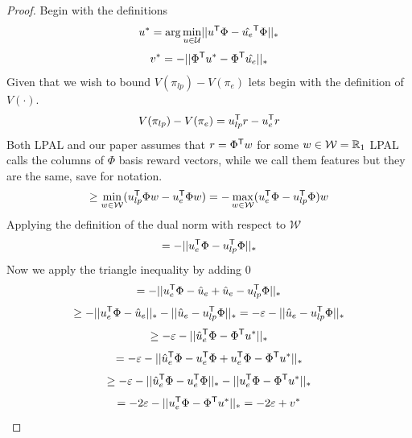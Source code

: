 \documentclass[11pt]{uai2023}
\begin{document}
\begin{proof}
	Begin with the definitions
	\[
		u^* = \arg\min_{u \in \mathcal{U}} \lvert\lvert u^{\mathsf{T}} \Phi - \hat{u_e}^{\mathsf{T}} \Phi \rvert\rvert_*
	\]
	\[
		v^* = - \lvert\lvert \Phi^{\mathsf{T}} u^* - \Phi^{\mathsf{T}} \hat{u_e} \rvert\rvert_*
	\]
	Given that we wish to bound $V(\pi_{lp}) - V(\pi_e)$ lets begin with the definition of $V(\cdot)$.
	\[V(\pi_{lp}) - V(\pi_e) = u_{lp}^{\mathsf{T}} r - u_e^{\mathsf{T}} r\]
	Both LPAL and our paper assumes that $r = \Phi^{\mathsf{T}} w$ for some $w \in \mathcal{W} = \mathbb{R}_{1}$ LPAL calls the columns of $\Phi$ basis
	reward vectors, while we call them features but they are the same, save for notation.
	\[\geq \min_{w \in \mathcal{W}}(u_{lp}^{\mathsf{T}} \Phi w - u_e^{\mathsf{T}} \Phi w) =- \max_{w \in \mathcal{W}}(u_e^{\mathsf{T}} \Phi - u_{lp}^{\mathsf{T}} \Phi)w \]
	Applying the definition of the dual norm with respect to $\mathcal{W}$
	\[= -\lvert\lvert u_e^{\mathsf{T}} \Phi - u_{lp}^{\mathsf{T}} \Phi \rvert\rvert_*\]
	Now we apply the triangle inequality by adding 0
	\[= -\lvert\lvert u_e^{\mathsf{T}} \Phi - \hat{u}_e + \hat{u}_e - u_{lp}^{\mathsf{T}} \Phi \rvert\rvert_*\]
	\[\geq -\lvert\lvert u_e^{\mathsf{T}} \Phi - \hat{u}_e\rvert\rvert_* - \lvert\lvert \hat{u}_e - u_{lp}^{\mathsf{T}} \Phi \rvert\rvert_* = -\varepsilon - \lvert\lvert \hat{u}_e - u_{lp}^{\mathsf{T}} \Phi \rvert\rvert_* \]
	\[\geq -\varepsilon - \lvert\lvert \hat{u}_e^{\mathsf{T}} \Phi - \Phi^{\mathsf{T}} u^*\rvert\rvert_*\]
	\[= -\varepsilon - \lvert\lvert \hat{u}_e^{\mathsf{T}} \Phi - u_e^{\mathsf{T}}\Phi + u_e^{\mathsf{T}}\Phi - \Phi^{\mathsf{T}} u^*\rvert\rvert_*\]
	\[\geq -\varepsilon - \lvert\lvert \hat{u}_e^{\mathsf{T}} \Phi - u_e^{\mathsf{T}}\Phi\rvert\rvert_* - \lvert\lvert u_e^{\mathsf{T}}\Phi - \Phi^{\mathsf{T}} u^*\rvert\rvert_*\]
	\[= -2\varepsilon - \lvert\lvert u_e^{\mathsf{T}}\Phi - \Phi^{\mathsf{T}} u^*\rvert\rvert_* = -2\varepsilon + v^*\]
\end{proof}
\end{document}
